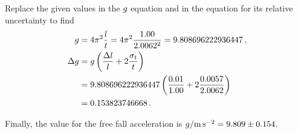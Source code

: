 Replace the given values in the $\grav$ equation and in the equation for its relative uncertainty to find
%
\begin{align*}
    \grav &= 4\pi^2\dfrac{\length}{\period} 
          = 4\pi^2\dfrac{1.00}{2.0062^2}
          = 9.808696222936447\,,\\
%
    \muncer\grav &= \grav\left(\dfrac{\muncer\length}{\length} + 2\dfrac{\sstdev_\period}{\period}\right)\\
                 &= 9.808696222936447\left(\dfrac{0.01}{1.00} + 2\dfrac{0.0057}{2.0062}\right)\\
                 &= 0.153823746668\,.
\end{align*}

Finally, the value for the free fall acceleration is $\grav/\si{m.s^{-2}} = 9.809 \pm 0.154$.

